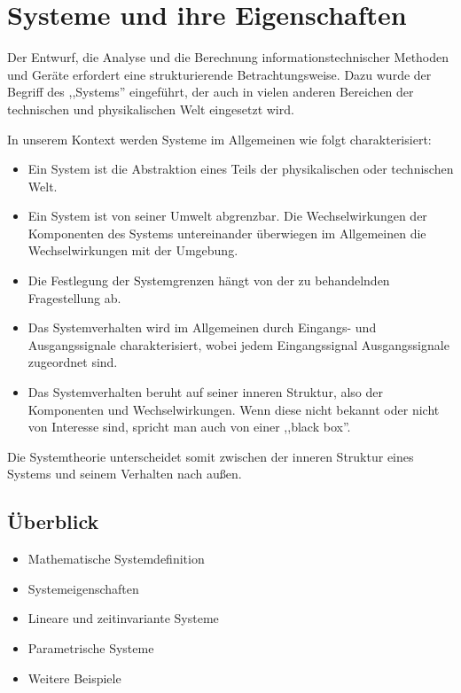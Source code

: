 \chapter{Systeme und ihre Eigenschaften}
\label{chap:systeme}

Der Entwurf, die Analyse und die Berechnung informationstechnischer Methoden und Geräte erfordert eine strukturierende Betrachtungsweise. Dazu wurde der Begriff des ,,Systems'' eingeführt, der auch in vielen anderen Bereichen der technischen und physikalischen Welt eingesetzt wird.

In unserem Kontext werden Systeme im Allgemeinen wie folgt charakterisiert:

\begin{itemize}
  \item Ein System ist die Abstraktion eines Teils der physikalischen oder technischen Welt.
  \item Ein System ist von seiner Umwelt abgrenzbar. Die Wechselwirkungen der Komponenten des Systems untereinander überwiegen im Allgemeinen die Wechselwirkungen mit der Umgebung.
  \item Die Festlegung der Systemgrenzen hängt von der zu behandelnden Fragestellung ab.
  \item Das Systemverhalten wird im Allgemeinen durch Eingangs- und Ausgangssignale charakterisiert, wobei jedem Eingangssignal Ausgangssignale zugeordnet sind.
  \item Das Systemverhalten beruht auf seiner inneren Struktur, also der Komponenten und Wechselwirkungen. Wenn diese nicht bekannt oder nicht von Interesse sind, spricht man auch von einer ,,black box''.
\end{itemize}

Die Systemtheorie unterscheidet somit zwischen der inneren Struktur eines Systems und seinem Verhalten nach außen.

\section*{Überblick}

\begin{itemize}
  \item[3.1] Mathematische Systemdefinition
  \item[3.2] Systemeigenschaften
  \item[3.3] Lineare und zeitinvariante Systeme
  \item[3.4] Parametrische Systeme
  \item[3.5] Weitere Beispiele
\end{itemize}

